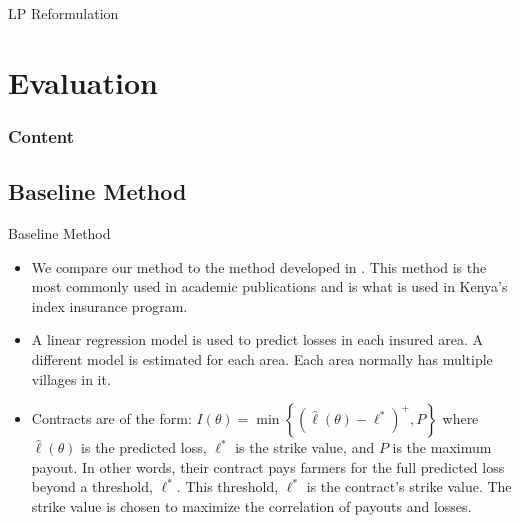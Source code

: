 \documentclass{beamer}
\begin{document}
\begin{frame}{LP Reformulation}
\end{frame}

\section{Evaluation}
\begin{frame}
    \frametitle{Content}
\end{frame}
\subsection{Baseline Method}\label{baseline}
\begin{frame}{Baseline Method}
    \begin{itemize}
        \setlength\itemsep{1em}
        \item We compare our method to the method developed in \cite{chantarat2013designing}. This method is the most commonly used in academic publications and is what is used in Kenya's index insurance program. 
        \item A linear regression model is used to predict losses in each insured area. A different model is estimated for each area. Each area normally has multiple villages in it. 
        \item Contracts are of the form: $I(\theta) = \min \left \{ (\hat{\ell}(\theta)-\ell^*)^+,P \right \}$ where $\hat{\ell}(\theta)$ is the predicted loss,  $\ell^*$ is the strike value, and $P$ is the maximum payout. In other words, their contract pays farmers for the full predicted loss beyond a threshold, $\ell^*$. This threshold, $\ell^*$ is the contract's strike value. The strike value is chosen to maximize the correlation of payouts and losses. 
    \end{itemize}
\end{frame}
\end{document}
